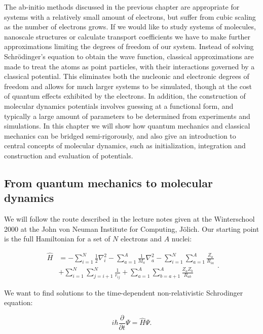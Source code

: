The ab-initio methods discussed in the previous chapter
are appropriate for systems with a relatively small amount of electrons,
but suffer from cubic scaling as the number of electrons grows.
If we would like to study systems of molecules, nanoscale structures
or calculate transport coefficients we have to make further approximations
limiting the degrees of freedom of our system.
Instead of solving Schr\"{o}dinger's equation to obtain
the wave function, classical approximations are made to
treat the atoms as point particles, with their interactions
governed by a classical potential. This eliminates both the nucleonic
and electronic degrees of freedom and allows for much larger systems
to be simulated, though at the cost of quantum effects
exhibited by the electrons. In addition, the construction
of molecular dynamics potentials involves guessing at a functional
form, and typically a large amount of parameters to be determined
from experiments and simulations.
In this chapter we will show how quantum mechanics
and classical mechanics can be bridged semi-rigorously,
and also give an introduction to central concepts of molecular dynamics,
such as initialization, integration and construction and evaluation
of potentials.

\subsection{From quantum mechanics to molecular dynamics}
We will follow the route described in the lecture notes
\parencite[Marx, Dominik and Hutter, J\"{o}rg][pages 1-10]{marx2000}
given at the Winterschool 2000 at the John von Neuman Institute
for Computing, J\"{o}lich.
Our starting point is
the full Hamiltonian for a set of $N$ electrons and $A$ nuclei:

\begin{equation}
    \begin{split}
        \hat{H}
        &= -\sum_{i=1}^N \frac{1}{2} \nabla_i^2
        -\sum_{a=1}^A \frac{1}{M_a} \nabla_a^2
        -\sum_{i=1}^N \sum_{a=1}^A \frac{Z_a}{R_{ia}} \\
        &+ \sum_{i=1}^N \sum_{j=i+1}^N \frac{1}{r_{ij}}
        + \sum_{a=1}^A \sum_{b=a+1}^A \frac{Z_a Z_b}{R_{ab}}
    \end{split} .
\end{equation}

We want to find solutions to the time-dependent non-relativistic
Schrodinger equation:

$$ i\hbar \frac{\partial}{\partial t} \Psi = \hat{H} \Psi . $$

